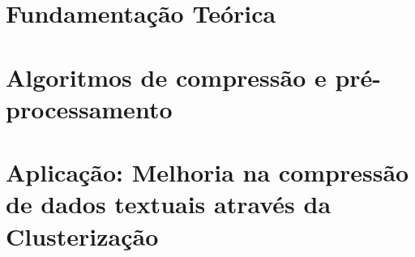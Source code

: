 \documentclass[
	12pt,					%
	openright,				%
	twoside,					%
	a4paper,					%
	english,					%
	brazil					%
	]{abntex2}
\begin{document}


\part{Fundamentação Teórica}



\part{Algoritmos de compressão e pré-processamento}



\part{Aplicação: Melhoria na compressão de dados textuais através da Clusterização}


%
%

%

%
%

\postextual
\end{document}
